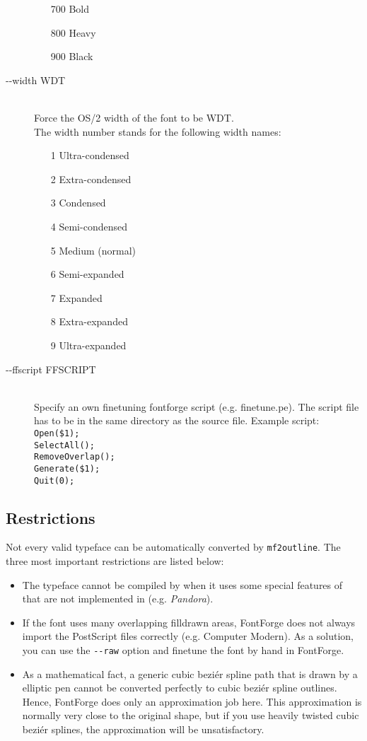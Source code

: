 \documentclass{scrartcl}
\begin{document}
\begin{description}
\begin{itemize}
		 	\item[700] Bold
		 	\item[800] Heavy
		 	\item[900] Black
		 \end{itemize}
	\item[-{}-width WDT] \hfill \\
		Force the OS/2 width of the font to be WDT.\\
		 The width number stands for the following width names:
		 \begin{itemize}
		 	\item[1] Ultra-condensed
		 	\item[2] Extra-condensed
		 	\item[3] Condensed
		 	\item[4] Semi-condensed
		 	\item[5] Medium (normal)
		 	\item[6] Semi-expanded
		 	\item[7] Expanded
		 	\item[8] Extra-expanded
		 	\item[9] Ultra-expanded
		 \end{itemize}
	\item[ -{}-ffscript FFSCRIPT] \hfill \\
		Specify an own finetuning fontforge script (e.g. finetune.pe). The script file has to be in the same directory as the source file. Example script:\\
		\verb|Open($1);|\\
		\verb|SelectAll();|\\
		\verb|RemoveOverlap();|\\
		\verb|Generate($1);|\\
		\verb|Quit(0);|
\end{description}
%
\subsection{Restrictions}
%
Not every valid \MF{} typeface can be automatically converted by \verb|mf2outline|. The three most important restrictions are listed below:
\begin{itemize}
	\item The \MF{} typeface cannot be compiled by \MP{} when it uses some special features of \MF{} that are not implemented in \MP{} (e.g. \emph{Pandora}).
	\item If the font uses many overlapping filldrawn areas, FontForge does not always import the PostScript files correctly (e.g. Computer Modern). As a solution, you can use the \verb|--raw| option and finetune the font by hand in FontForge.
	\item As a mathematical fact, a generic cubic beziér spline path that is drawn by a elliptic pen cannot be converted perfectly to cubic beziér spline outlines. Hence, FontForge does only an approximation job here. This approximation is normally very close to the original shape, but if you use heavily twisted cubic beziér splines, the approximation will be unsatisfactory.
\end{itemize}
%
\end{document}
